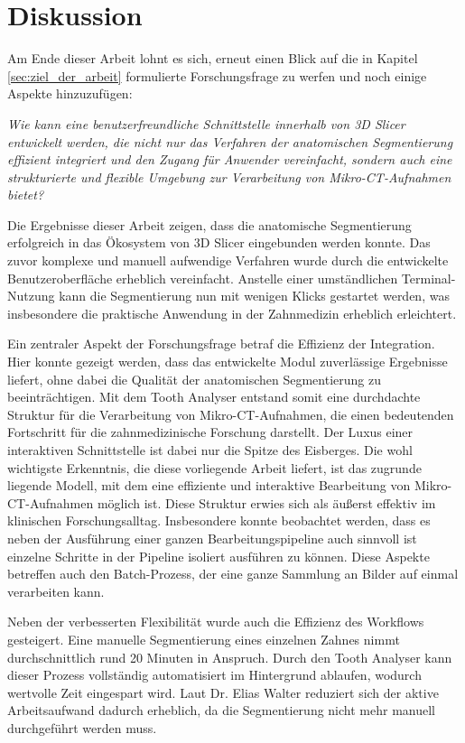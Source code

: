 \chapter{Diskussion}
\label{chap:diskussion} Am Ende dieser Arbeit lohnt es sich, erneut einen Blick
auf die in Kapitel \ref{sec:ziel_der_arbeit} formulierte Forschungsfrage zu
werfen und noch einige Aspekte hinzuzufügen:

\begin{center}
	\textit{Wie kann eine benutzerfreundliche Schnittstelle innerhalb von 3D
	Slicer entwickelt werden, die nicht nur das Verfahren der anatomischen Segmentierung
	effizient integriert und den Zugang für Anwender vereinfacht, sondern auch
	eine strukturierte und flexible Umgebung zur Verarbeitung von Mikro-\ac{CT}-Aufnahmen
	bietet?}
\end{center}

Die Ergebnisse dieser Arbeit zeigen, dass die anatomische Segmentierung
erfolgreich in das Ökosystem von 3D Slicer eingebunden werden konnte. Das zuvor komplexe
und manuell aufwendige Verfahren wurde durch die entwickelte Benutzeroberfläche erheblich
vereinfacht. Anstelle einer umständlichen Terminal-Nutzung kann die
Segmentierung nun mit wenigen Klicks gestartet werden, was insbesondere die praktische
Anwendung in der Zahnmedizin erheblich erleichtert.

Ein zentraler Aspekt der Forschungsfrage betraf die Effizienz der Integration.
Hier konnte gezeigt werden, dass das entwickelte Modul zuverlässige Ergebnisse liefert,
ohne dabei die Qualität der anatomischen Segmentierung zu beeinträchtigen. Mit dem
Tooth Analyser entstand somit eine durchdachte Struktur für die Verarbeitung von
Mikro-\ac{CT}-Aufnahmen, die einen bedeutenden Fortschritt für die zahnmedizinische
Forschung darstellt. Der Luxus einer interaktiven Schnittstelle ist dabei nur
die Spitze des Eisberges. Die wohl wichtigste Erkenntnis, die diese vorliegende
Arbeit liefert, ist das zugrunde liegende Modell, mit dem eine effiziente und
interaktive Bearbeitung von Mikro-CT-Aufnahmen möglich ist. Diese Struktur erwies
sich als äußerst effektiv im klinischen Forschungsalltag. Insbesondere konnte
beobachtet werden, dass es neben der Ausführung einer ganzen Bearbeitungspipeline
auch sinnvoll ist einzelne Schritte in der Pipeline isoliert ausführen zu können.
Diese Aspekte betreffen auch den Batch-Prozess, der eine ganze Sammlung an Bilder
auf einmal verarbeiten kann.

Neben der verbesserten Flexibilität wurde auch die Effizienz des Workflows gesteigert.
Eine manuelle Segmentierung eines einzelnen Zahnes nimmt durchschnittlich rund
20 Minuten in Anspruch. Durch den Tooth Analyser kann dieser Prozess vollständig
automatisiert im Hintergrund ablaufen, wodurch wertvolle Zeit eingespart wird. Laut
Dr. Elias Walter reduziert sich der aktive Arbeitsaufwand dadurch erheblich, da die
Segmentierung nicht mehr manuell durchgeführt werden muss.

